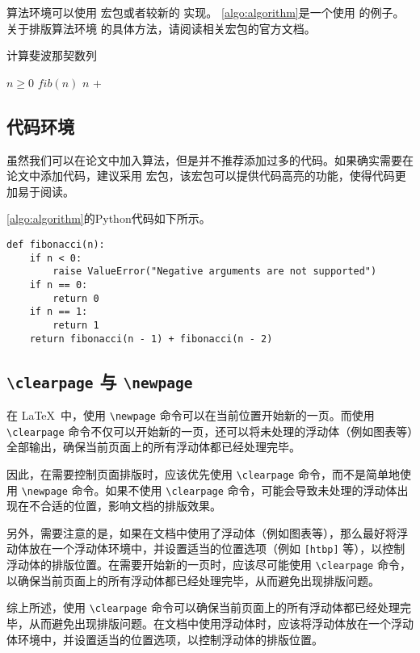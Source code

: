 算法环境可以使用  宏包或者较新的  实现。
\cref{algo:algorithm}是一个使用  的例子。关于排版算法环境
的具体方法，请阅读相关宏包的官方文档。

\begin{algorithm}
    \caption{计算斐波那契数列}\label{algo:algorithm}
    \begin{algorithmic}[1]
        \Require $n \geq 0$
        \Ensure $fib(n)$
        \State \Return $n$
        \Else
        \State \Return {} + 
        \EndIf
        \EndFunction
    \end{algorithmic}
\end{algorithm}

\subsection{代码环境}

虽然我们可以在论文中加入算法，但是并不推荐添加过多的代码。如果确实需要在论文中添加代码，建议采用  宏包，该宏包可以提供代码高亮的功能，使得代码更加易于阅读。

\cref{algo:algorithm}的Python代码如下所示。

\begin{verbatim}
def fibonacci(n):
    if n < 0:
        raise ValueError("Negative arguments are not supported")
    if n == 0:
        return 0
    if n == 1:
        return 1
    return fibonacci(n - 1) + fibonacci(n - 2)
\end{verbatim}

\subsection*{\texttt{\textbackslash{}clearpage} 与 \texttt{\textbackslash{}newpage}}

在 \LaTeX\ 中，使用 \verb|\newpage| 命令可以在当前位置开始新的一页。而使用 \verb|\clearpage| 命令不仅可以开始新的一页，还可以将未处理的浮动体（例如图表等）全部输出，确保当前页面上的所有浮动体都已经处理完毕。

因此，在需要控制页面排版时，应该优先使用 \verb|\clearpage| 命令，而不是简单地使用 \verb|\newpage| 命令。如果不使用 \verb|\clearpage| 命令，可能会导致未处理的浮动体出现在不合适的位置，影响文档的排版效果。

另外，需要注意的是，如果在文档中使用了浮动体（例如图表等），那么最好将浮动体放在一个浮动体环境中，并设置适当的位置选项（例如 \verb|[htbp]| 等），以控制浮动体的排版位置。在需要开始新的一页时，应该尽可能使用 \verb|\clearpage| 命令，以确保当前页面上的所有浮动体都已经处理完毕，从而避免出现排版问题。

综上所述，使用 \verb|\clearpage| 命令可以确保当前页面上的所有浮动体都已经处理完毕，从而避免出现排版问题。在文档中使用浮动体时，应该将浮动体放在一个浮动体环境中，并设置适当的位置选项，以控制浮动体的排版位置。